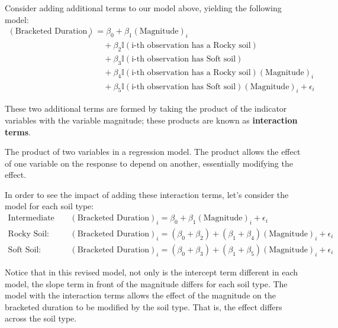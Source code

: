 \documentclass[]{book}
\theoremstyle{definition}
\theoremstyle{definition}
\theoremstyle{definition}
\theoremstyle{remark}
\let\BeginKnitrBlock\begin \let\EndKnitrBlock\end
\begin{document}
Consider adding additional terms to our model above, yielding the
following model: \[
\begin{aligned}
  (\text{Bracketed Duration})_i &= \beta_0 + \beta_1(\text{Magnitude})_i \\
    &\quad + \beta_2\mathbb{I}(\text{i-th observation has a Rocky soil}) \\
    &\quad + \beta_3\mathbb{I}(\text{i-th observation has Soft soil}) \\
    &\quad + \beta_4\mathbb{I}(\text{i-th observation has a Rocky soil})(\text{Magnitude})_i \\
    &\quad + \beta_5\mathbb{I}(\text{i-th observation has Soft soil})(\text{Magnitude})_i + \epsilon_i
\end{aligned}
\]

These two additional terms are formed by taking the product of the
indicator variables with the variable magnitude; these products are
known as \textbf{interaction terms}.

\BeginKnitrBlock{definition}[Interaction Term]
\protect\hypertarget{def:defn-interaction-term}{}{\label{def:defn-interaction-term}
{} }The product of two variables in a
regression model. The product allows the effect of one variable on the
response to depend on another, essentially modifying the effect.
\EndKnitrBlock{definition}

In order to see the impact of adding these interaction terms, let's
consider the model for each soil type: \[
\begin{aligned}
  \text{Intermediate Soil:} &\quad (\text{Bracketed Duration})_i = \beta_0 + \beta_1(\text{Magnitude})_i + \epsilon_i\\
  \text{Rocky Soil:} &\quad (\text{Bracketed Duration})_i = \left(\beta_0 + \beta_2\right) + \left(\beta_1 + \beta_4\right)(\text{Magnitude})_i + \epsilon_i\\
  \text{Soft Soil:} &\quad (\text{Bracketed Duration})_i = \left(\beta_0 + \beta_3\right) + \left(\beta_1+\beta_5\right)(\text{Magnitude})_i + \epsilon_i
\end{aligned}
\]

Notice that in this revised model, not only is the intercept term
different in each model, the slope term in front of the magnitude
differs for each soil type. The model with the interaction terms allows
the effect of the magnitude on the bracketed duration to be modified by
the soil type. That is, the effect differs across the soil type.
\end{document}
